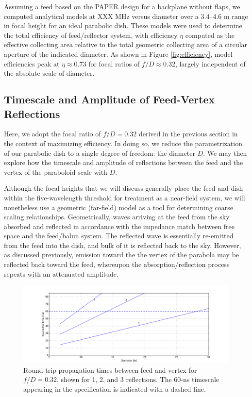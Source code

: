 \documentclass[11pt]{article}
\begin{document}
Assuming a feed based on the PAPER design for a backplane without flaps,
we computed analytical models at XXX MHz versus diameter over a 3.4--4.6 m range in focal height
for an ideal parabolic dish.  These models were used to determine the total efficiency of
feed/reflector system, with efficiency $\eta$ computed as the effective collecting area
relative to the total geometric collecting area of a circular aperture of the
indicated diameter.
As shown in Figure \ref{fig:efficiency},
model efficiencies peak at $\eta\approx0.73$ for focal ratios of $f/D\approx0.32$, largely
independent of the absolute scale of diameter.

\subsection{Timescale and Amplitude of Feed-Vertex Reflections}

Here, we adopt the focal ratio of $f/D=0.32$ derived in the previous section in
the context of maximizing efficiency.  In doing so, we reduce the parametrization of our parabolic
dish to a single degree of freedom: the diameter $D$.  We may then explore how the timescale
and amplitude of reflections between the feed and the vertex of the paraboloid scale with $D$.

Although the focal heights that we will discuss generally place the feed and dish within
the five-wavelength threshold for treatment as a near-field system, we will nonetheless
use a geometric (far-field) model as a tool for determining coarse scaling relationships.
Geometrically, waves arriving at the feed from the sky absorbed and reflected in accordance with
the impedance match between free space and the feed/balun system.  The reflected wave
is essentially re-emitted from the feed into the dish, and bulk of it is reflected back to the
sky.  However, as discussed previously, emission toward the the vertex of the parabola may be reflected
back toward the feed, whereupon the absorption/reflection process repeats with an attenuated amplitude.

\begin{figure}[h]
\centering
\includegraphics[width=1.0\textwidth]{roundtrip.png}
\caption{Round-trip propagation times between feed and vertex for $f/D=0.32$, 
shown for 1, 2, and 3 reflections.  The 60-ns timescale appearing in the specification
is indicated with a dashed line.}
\label{fig:roundtrip}
\end{figure}
\end{document}
